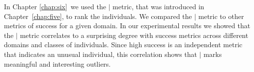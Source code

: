 

In Chapter \ref{chap:six}\ we used the $\mid$ metric, that was introduced in Chapter~\ref{chap:five}, to rank the individuals. We compared the $\mid$ metric to other metrics of success for a given domain.
In our experimental results we showed that the $\mid$ metric correlates to a surprising degree with success metrics across different domains and classes of individuals. Since high success is an independent metric that indicates an unusual individual, this correlation shows that $\mid$ marks meaningful and interesting outliers.


